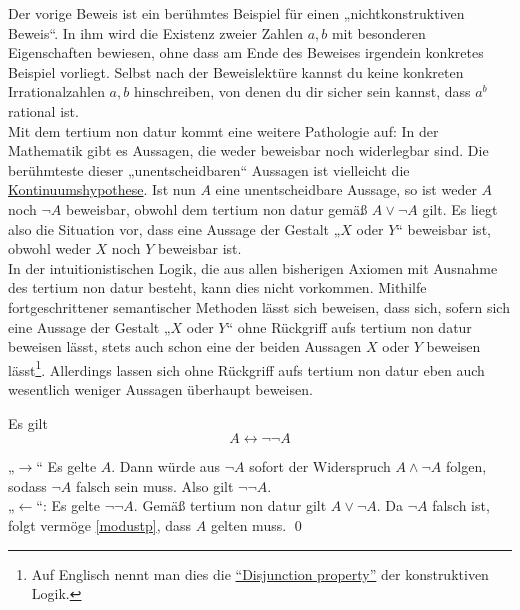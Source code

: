    
   
   \begin{bem}
Der vorige Beweis ist ein berühmtes Beispiel für einen „nichtkonstruktiven Beweis“. In ihm wird die Existenz zweier Zahlen $a,b$ mit besonderen Eigenschaften bewiesen, ohne dass am Ende des Beweises irgendein konkretes Beispiel vorliegt. Selbst nach der Beweislektüre kannst du keine konkreten Irrationalzahlen $a,b$ hinschreiben, von denen du dir sicher sein kannst, dass $a^b$ rational ist. \\
Mit dem tertium non datur kommt eine weitere Pathologie auf: In der Mathematik gibt es Aussagen, die weder beweisbar noch widerlegbar sind. Die berühmteste dieser „unentscheidbaren“ Aussagen ist vielleicht die \href{https://de.wikipedia.org/wiki/Kontinuumshypothese}{Kontinuumshypothese}. Ist nun $A$ eine unentscheidbare Aussage, so ist weder $A$ noch $\neg A$ beweisbar, obwohl dem tertium non datur gemäß $A\lor \neg A$ gilt. Es liegt also die Situation vor, dass eine Aussage der Gestalt „$X$ oder $Y$“ beweisbar ist, obwohl weder $X$ noch $Y$ beweisbar ist. \\
In der intuitionistischen Logik, die aus allen bisherigen Axiomen mit Ausnahme des tertium non datur besteht, kann dies nicht vorkommen. Mithilfe fortgeschrittener semantischer Methoden lässt sich beweisen, dass sich, sofern sich eine Aussage der Gestalt „$X$ oder $Y$“ ohne Rückgriff aufs tertium non datur beweisen lässt, stets auch schon eine der beiden Aussagen $X$ oder $Y$ beweisen lässt\footnote{Auf Englisch nennt man dies die \href{https://en.wikipedia.org/wiki/Disjunction_and_existence_properties}{``Disjunction property''} der konstruktiven Logik.}. Allerdings lassen sich ohne Rückgriff aufs tertium non datur eben auch wesentlich weniger Aussagen überhaupt beweisen.
   \end{bem}


   
\begin{sat} \label{doubleneg}
Es gilt
 \[ A\leftrightarrow \neg \neg A \]
\end{sat}
\begin{bew}[(*)]
 „$\to$“ Es gelte $A$. Dann würde aus $\neg A$ sofort der Widerspruch $A\land \neg A$ folgen, sodass $\neg A$ falsch sein muss. Also gilt $\neg\neg A$. \\
 „$\leftarrow$“: Es gelte $\neg \neg A$. Gemäß tertium non datur gilt $A\lor \neg A$. Da $\neg A$ falsch ist, folgt vermöge \cref{modustp}, dass $A$ gelten muss. \qed
\end{bew}





